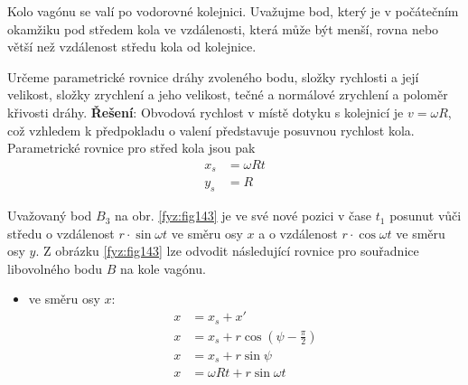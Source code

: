 \begin{mdframed}[style=mdexam]
  \begin{example}\label{fyz:fey_exam003}
    Kolo vagónu se valí po vodorovné kolejnici. Uvažujme bod, který je v počátečním okamžiku pod
    středem kola ve vzdálenosti, která může být menší, rovna nebo větší než vzdálenost středu kola
    od kolejnice.

    {\centering
      \captionsetup{type=figure}
      \label{fyz:fig141}
    \par}
    \vspace{0.5em}
    Určeme parametrické rovnice dráhy zvoleného bodu, složky rychlosti a její velikost, složky 
    zrychlení a jeho velikost, tečné a normálové zrychlení a poloměr křivosti dráhy. 
    \cite[p.~11]{Slavik}
    \vspace{1em}
    \newline
    \textbf{Řešení}: Obvodová rychlost v místě dotyku s kolejnicí je \(v=\omega R\), což vzhledem k
    předpokladu o valení představuje posuvnou rychlost kola. Parametrické rovnice pro střed kola
    jsou pak
    \begin{subequations}\label{mech:eq_wheel_center}
      \begin{align}
        x_s &= \omega R t \\
        y_s &= R
      \end{align}
    \end{subequations}

    {\centering
      \captionsetup{type=figure}
      \label{fyz:fig143}
    \par}
    \vspace{0.5em}
    Uvažovaný bod \(B_3\) na obr. \ref{fyz:fig143} je ve své nové pozici v čase \(t_1\) posunut vůči
    středu o vzdálenost \(r\cdot\sin\omega t\) ve směru osy \(x\) a o vzdálenost \(r\cdot\cos\omega
    t\) ve směru osy \(y\). Z obrázku \ref{fyz:fig143} lze odvodit následující rovnice pro
    souřadnice libovolného bodu \(B\) na kole vagónu.  
            
      \begin{itemize}
        \item ve směru osy \(x\):
        \begin{align*}
          x &= x_s + x'                        \\
          x &= x_s + r\cos(\psi-\frac{\pi}{2}) \\
          x &= x_s + r\sin\psi                 \\
          x &= \omega R t + r\sin\omega t
        \end{align*}
        \end{itemize}  



\end{example}
\end{mdframed}
